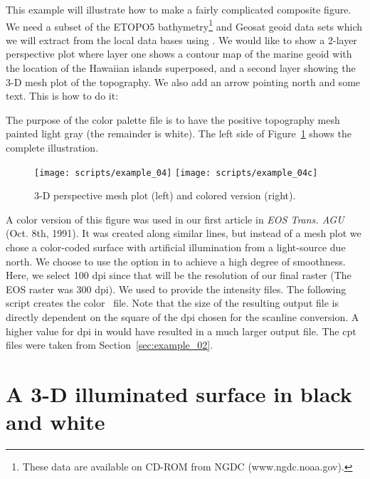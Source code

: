This example will illustrate how to make a fairly complicated
composite figure.  We need a subset of the ETOPO5 bathymetry\footnote{
These data are available on CD-ROM from NGDC (www.ngdc.noaa.gov).}
and Geosat geoid data sets which we will extract from the local
data bases using .  We would like to show a
2-layer perspective plot where layer one shows a contour map
of the marine geoid with the location of the Hawaiian islands
superposed, and a second layer showing the 3-D mesh plot of
the topography.  We also add an arrow pointing north and some
text.  This is how to do it:


The purpose of the color palette file  is to have
the positive topography mesh painted light gray (the remainder
is white). The left side of Figure~\ref{fig:GMT_example_04} shows the complete illustration.

\begin{figure}[ht]
   \texttt{[image: scripts/example\_04]}\hfill
   \texttt{[image: scripts/example\_04c]}
   \caption{3-D perspective mesh plot (left) and colored version (right).}
   \label{fig:GMT_example_04}
\end{figure}

A color version of this figure was used in our first article in \emph{EOS
Trans. AGU} (Oct. 8th, 1991).  It was created along similar
lines, but instead of a mesh plot we chose a color-coded surface
with artificial illumination from a light-source due north.
We choose to use the  option in  to
achieve a high degree of smoothness.  Here, we select 100 dpi
since that will be the resolution of our final raster
(The EOS raster was 300 dpi). We used  to
provide the intensity files.  The following script creates
the color \PS\ file.  Note that the size of the
resulting output file is directly dependent on the square of
the dpi chosen for the scanline conversion.  A higher value
for dpi in  would have resulted in a much larger
output file.  The cpt files were taken from Section~\ref{sec:example_02}.



\section{A 3-D illuminated surface in black and white}

